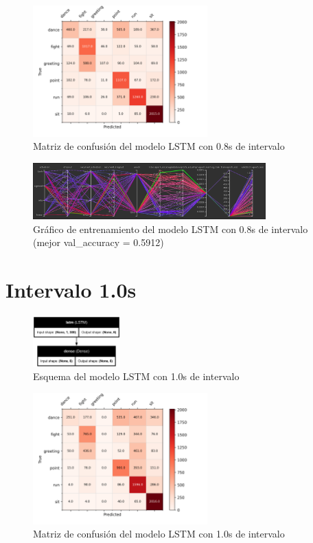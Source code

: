 \begin{figure}[H]
    \centering
    \includegraphics[width=0.6\textwidth]{Imagenes/Bitmap/CM_best-lstm0.8.png}
    \caption{Matriz de confusión del modelo LSTM con 0.8s de intervalo}
    \label{fig:lstm-0.8-matriz}
\end{figure}

\begin{figure}[H]
    \centering
    \includegraphics[width=0.8\textwidth]{Imagenes/Bitmap/tb-lstm-0.8.png}
    \caption{Gráfico de entrenamiento del modelo LSTM con 0.8s de intervalo (mejor val\_accuracy = 0.5912)}
    \label{fig:lstm-0.8-grafico}
\end{figure}

\section{Intervalo 1.0s}

\begin{figure}[H]
    \centering
    \includegraphics[width=0.3\textwidth]{Imagenes/Bitmap/best-lstm1.png}
    \caption{Esquema del modelo LSTM con 1.0s de intervalo}
    \label{fig:lstm-1.0-final}
\end{figure}

\begin{figure}[H]
    \centering
    \includegraphics[width=0.6\textwidth]{Imagenes/Bitmap/CM_best-lstm1.png}
    \caption{Matriz de confusión del modelo LSTM con 1.0s de intervalo}
    \label{fig:lstm-1.0-matriz}
\end{figure}

